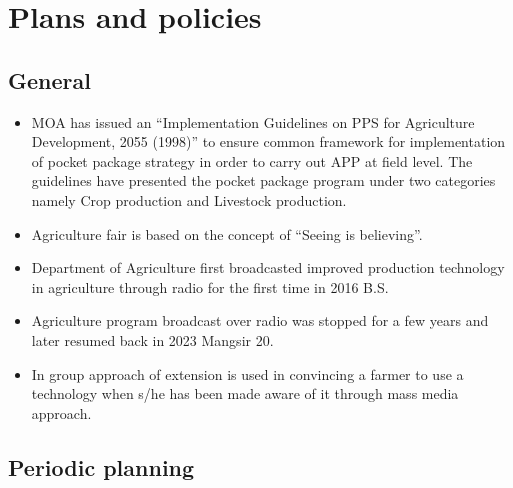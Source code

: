 \documentclass[
  openany]{book}
\providecommand{\tightlist}{%
  \setlength{\itemsep}{0pt}\setlength{\parskip}{0pt}}
\begin{document}
\hypertarget{plans-and-policies}{%
\chapter{Plans and policies}\label{plans-and-policies}}

\hypertarget{general}{%
\section{General}\label{general}}

\begin{itemize}
\tightlist
\item
  MOA has issued an ``Implementation Guidelines on PPS for Agriculture Development, 2055 (1998)'' to ensure common framework for implementation of pocket package strategy in order to carry out APP at field level. The guidelines have presented the pocket package program under two categories namely Crop production and Livestock production.
\item
  Agriculture fair is based on the concept of ``Seeing is believing''.
\item
  Department of Agriculture first broadcasted improved production technology in agriculture through radio for the first time in 2016 B.S.
\item
  Agriculture program broadcast over radio was stopped for a few years and later resumed back in 2023 Mangsir 20.
\item
  In group approach of extension is used in convincing a farmer to use a technology when s/he has been made aware of it through mass media approach.
\end{itemize}

\hypertarget{periodic-planning}{%
\section{Periodic planning}\label{periodic-planning}}
\end{document}

